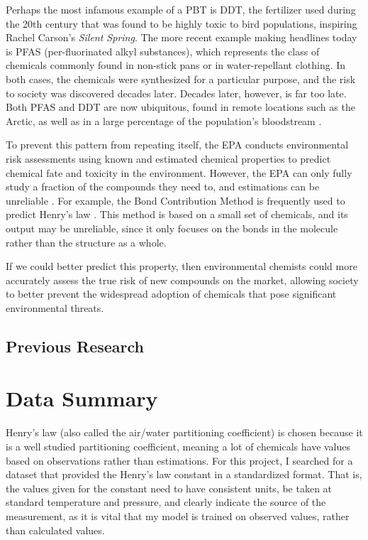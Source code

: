 \documentclass[12pt, oneside]{article}   	%
\begin{document}
Perhaps the most infamous example of a PBT is DDT, the fertilizer used during the 20th century that was found to be highly toxic to bird populations, inspiring Rachel Carson's \emph{Silent Spring}. The more recent example making headlines today is PFAS (per-fluorinated alkyl substances), which represents the class of chemicals commonly found in non-stick pans or in water-repellant clothing. In both cases, the chemicals were synthesized for a particular purpose, and the risk to society was discovered decades later. Decades later, however, is far too late. Both PFAS and DDT are now ubiquitous, found in remote locations such as the Arctic, as well as in a large percentage of the population's bloodstream \cite{czub}.

To prevent this pattern from repeating itself, the EPA conducts environmental risk assessments using known and estimated chemical properties to predict chemical fate and toxicity in the environment. However, the EPA can only fully study a fraction of the compounds they need to, and estimations can be unreliable \cite{burton}. For example, the Bond Contribution Method is frequently used to predict Henry's law \cite{meylan}. This method is based on a small set of chemicals, and its output may be unreliable, since it only focuses on the bonds in the molecule rather than the structure as a whole. 

If we could better predict this property, then environmental chemists could more accurately assess the true risk of new compounds on the market, allowing society to better prevent the widespread adoption of chemicals that pose significant environmental threats.

\subsection{Previous Research}





\section{Data Summary}
Henry's law (also called the air/water partitioning coefficient) is chosen because it is a well studied partitioning coefficient, meaning a lot of chemicals have values based on observations rather than estimations. For this project, I searched for a dataset that provided the Henry's law constant in a standardized format. That is, the values given for the constant need to have consistent units, be taken at standard temperature and pressure, and clearly indicate the source of the measurement, as it is vital that my model is trained on observed values, rather than calculated values. 
\end{document}
